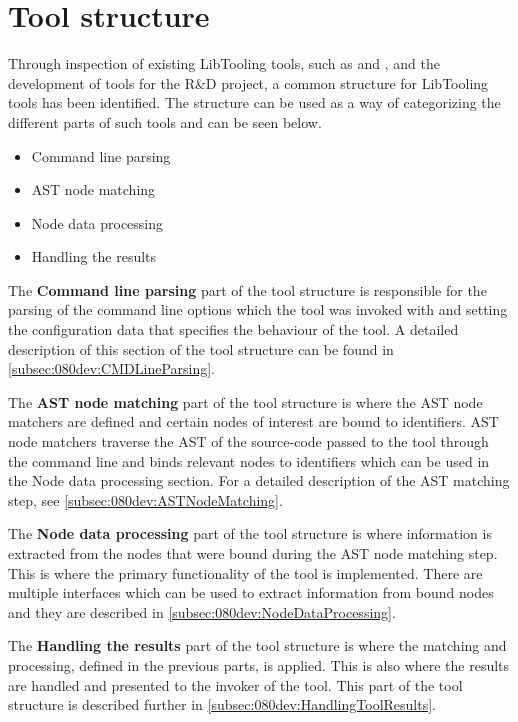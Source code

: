 \section{Tool structure} \label{sec:080dev:tool_structure}

Through inspection of existing LibTooling tools, such as \cite{clangExternalClangExamples} and \cite{llvmLLVMCompilerInfrastructure2023}, and the development of tools for the R\&D project, a common structure for LibTooling tools has been identified. The structure can be used as a way of categorizing the different parts of such tools and can be seen below.

\begin{itemize}
    \item Command line parsing
    \item AST node matching
    \item Node data processing
    \item Handling the results
\end{itemize}

The \textbf{Command line parsing} part of the tool structure is responsible for the parsing of the command line options which the tool was invoked with and setting the configuration data that specifies the behaviour of the tool. A detailed description of this section of the tool structure can be found in \cref{subsec:080dev:CMDLineParsing}.

The \textbf{AST node matching} part of the tool structure is where the AST node matchers are defined and certain nodes of interest are bound to identifiers. AST node matchers traverse the AST of the source-code passed to the tool through the command line and binds relevant nodes to identifiers which can be used in the Node data processing section. For a detailed description of the AST matching step, see \cref{subsec:080dev:ASTNodeMatching}.

The \textbf{Node data processing} part of the tool structure is where information is extracted from the nodes that were bound during the AST node matching step. This is where the primary functionality of the tool is implemented. There are multiple interfaces which can be used to extract information from bound nodes and they are described in \cref{subsec:080dev:NodeDataProcessing}.

The \textbf{Handling the results} part of the tool structure is where the matching and processing, defined in the previous parts, is applied. This is also where the results are handled and presented to the invoker of the tool. This part of the tool structure is described further in \cref{subsec:080dev:HandlingToolResults}.



